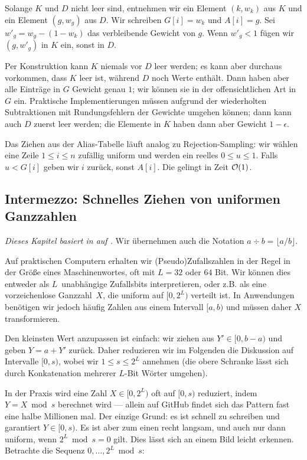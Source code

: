 Solange $K$ und $D$ nicht leer sind, entnehmen wir ein Element $(k, w_k)$ aus $K$ und ein Element $(g, w_g)$ aus $D$.
Wir schreiben $G[i] = w_k$ und $A[i] = g$.
Sei $w'_g = w_g - (1 - w_k)$ das verbleibende Gewicht von $g$.
Wenn $w'_g < 1$ fügen wir $(g, w'_g)$ in $K$ ein, sonst in $D$.

Per Konstruktion kann $K$ niemals vor $D$ leer werden; es kann aber durchaus vorkommen, dass $K$ leer ist, während $D$ noch Werte enthält.
Dann haben aber alle Einträge in $G$ Gewicht genau $1$; wir können sie in der offensichtlichen Art in $G$ ein.
Praktische Implementierungen müssen aufgrund der wiederholten Subtraktionen mit Rundungsfehlern der Gewichte umgehen können;
dann kann auch $D$ zuerst leer werden; die Elemente in $K$ haben dann aber Gewicht $1 - \epsilon$.

Das Ziehen aus der Alias-Tabelle läuft analog zu Rejection-Sampling:
wir wählen eine Zeile $1 \le i \le n$ zufällig uniform und werden ein reelles $0 \le u \le 1$.
Falls $u < G[i]$ geben wir $i$ zurück, sonst $A[i]$.
Die gelingt in Zeit $\mathcal{O}\!\left(1\right)$.

\subsection{Intermezzo: Schnelles Ziehen von uniformen Ganzzahlen}\label{subsec:uniforme_ganzzahlen}
\emph{Dieses Kapitel basiert in auf \cite{DBLP:journals/tomacs/Lemire19}.}
Wir übernehmen auch die Notation $a \div b = \lfloor a / b \rfloor$.

\bigskip

Auf praktischen Computern erhalten wir (Pseudo)Zufallszahlen in der Regel in der Größe eines Maschinenwortes, oft mit $L = 32$ oder $64$ Bit.
Wir können dies entweder als $L$~unabhängige Zufallsbits interpretieren, oder z.B. als eine vorzeichenlose Ganzzahl~$X$, die uniform auf $[0, 2^L)$ verteilt ist.
In Anwendungen benötigen wir jedoch häufig Zahlen aus einem Intervall $[a, b)$ und müssen daher $X$ transformieren.

Den kleinsten Wert anzupassen ist einfach: wir ziehen aus $Y' \in [0, b-a)$ und geben $Y = a + Y'$ zurück.
Daher reduzieren wir im Folgenden die Diskussion auf Intervalle $[0, s)$, wobei wir $1 \le s \le 2^L$ annehmen (die obere Schranke lässt sich durch Konkatenation mehrerer $L$-Bit Wörter umgehen).

In der Praxis wird eine Zahl $X \in [0, 2^L)$ oft auf $[0, s)$ reduziert, indem $Y = X \bmod s$ berechnet wird
--- allein auf GitHub findet sich das Pattern  fast eine halbe Millionen mal.
Der einzige Grund: es ist schnell zu schreiben und garantiert $Y \in [0, s)$.
Es ist aber zum einen recht langsam, und auch nur dann uniform, wenn $2^L \bmod s = 0$ gilt.
Dies lässt sich an einem Bild leicht erkennen.
Betrachte die Sequenz $0, \ldots, 2^L \bmod s$:


